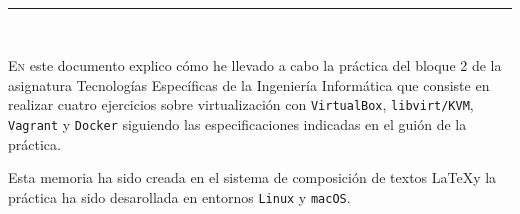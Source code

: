 
\begin{center}
	{\fboxrule=4pt } \\
	\rule{15cm}{0pt} \\
\end{center}

 
 \lettrine[lines=3, depth = 0]{E}{n} este documento explico cómo he llevado a cabo 
 la práctica del bloque 2 de la asignatura Tecnologías Específicas de la Ingeniería 
 Informática que consiste en realizar cuatro ejercicios sobre virtualización con 
 \texttt{VirtualBox}, \texttt{libvirt/KVM}, \texttt{Vagrant} y \texttt{Docker}
 siguiendo las especificaciones indicadas en el guión de la práctica.
 
 \par Esta memoria ha sido creada en el sistema de composición de textos \LaTeX y 
 la práctica ha sido desarollada en entornos \texttt{Linux} y \texttt{macOS}.

\newpage
{}